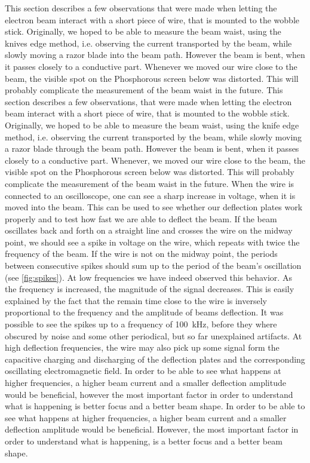 This section describes a few observations that were made when letting the electron beam interact with a short piece of wire, that is mounted to the wobble stick. Originally, we hoped to be able to measure the beam waist, using the knives edge method, i.e. observing the current transported by the beam, while slowly moving a razor blade into the beam path. However the beam is bent, when it passes closely to a conductive part. Whenever we moved our wire close to the beam, the visible spot on the Phosphorous screen below was distorted. This will probably complicate the measurement of the beam waist in the future. 
This section describes a few observations, that were made when letting the electron beam interact with a short piece of wire, that is mounted to the wobble stick. Originally, we hoped to be able to measure the beam waist, using the knife edge method, i.e. observing the current transported by the beam, while slowly moving a razor blade through the beam path. However the beam is bent, when it passes closely to a conductive part. Whenever, we moved our wire close to the beam, the visible spot on the Phosphorous screen below was distorted. This will probably complicate the measurement of the beam waist in the future. 
When the wire is connected to an oscilloscope, one can see a sharp increase in voltage, when it is moved into the beam. This can be used to see whether our deflection plates work properly and to test how fast we are able to deflect the beam. If the beam oscillates back and forth on a straight line and crosses the wire on the midway point, we should see a spike in voltage on the wire, which repeats with twice the frequency of the beam. If the wire is not on the midway point, the periods between consecutive spikes should sum up to the period of the beam's oscillation (see \cref{fig:spikes}). At low frequencies we have indeed observed this behavior. As the frequency is increased, the magnitude of the signal decreases. This is easily explained by the fact that the remain time close to the wire is inversely proportional to the frequency and the amplitude of beams deflection. It was possible to see the spikes up to a frequency of \SI{100}{\kilo\hertz}, before they where obscured by noise and some other periodical, but so far unexplained artifacts.
At high deflection frequencies, the wire may also pick up some signal form the capacitive charging and discharging of the deflection plates and the corresponding oscillating electromagnetic field.
In order to be able to see what happens at higher frequencies, a higher beam current and a smaller deflection amplitude would be beneficial, however the most important factor in order to understand what is happening is better focus and a better beam shape.
In order to be able to see what happens at higher frequencies, a higher beam current and a smaller deflection amplitude would be beneficial. However, the most important factor in order to understand what is happening, is a better focus and a better beam shape.

